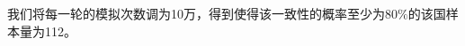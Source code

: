 \documentclass{article}
\begin{document}
我们将每一轮的模拟次数调为10万，得到使得该一致性的概率至少为$80\%$的该国样本量为112。

% 
% 



% 
\end{document}
